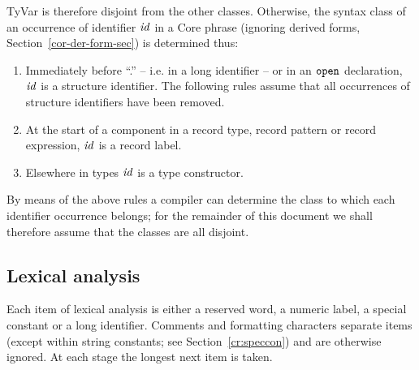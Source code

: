 TyVar is therefore disjoint
from the other  classes.   
Otherwise, the syntax class of an occurrence of
identifier ${\it id}$ in a Core phrase (ignoring derived forms, 
Section~\ref{cor-der-form-sec}) is determined thus:
\begin{enumerate}
  \item Immediately before ``.'' -- i.e. in a long identifier -- or in an
        ${\tt open}$ declaration, ${\it id}$ is a structure
        identifier.  The following rules assume that all occurrences of
        structure identifiers have been removed.
  \item At the start of a component in a record type, record pattern or record
        expression,  ${\it id}$ is a record label.
  \item Elsewhere in types ${\it id}$ is a type constructor.
\end{enumerate}

By means of the above rules a compiler can determine the class to which each
identifier occurrence belongs; for the remainder of this document we shall
therefore assume that the classes are all disjoint.

\subsection{Lexical analysis}
Each item of lexical analysis is either a reserved word, a numeric label, a
special constant or a long identifier.
Comments and formatting characters
separate items (except within string constants; see Section~\ref{cr:speccon})
and are otherwise
ignored.   At each stage the longest next item is taken.

